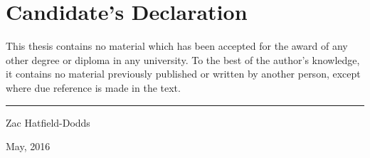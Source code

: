 \chapter{Candidate's Declaration}

This thesis contains no material which has been accepted for the award
of any other degree or diploma in any university. To the best of the
author's knowledge, it contains no material previously published or written
by another person, except where due reference is made in the text.


\vspace{20mm}  %

\hspace{80mm}\rule{40mm}{.15mm}\par   %
\hspace{80mm} Zac Hatfield-Dodds\par
\hspace{80mm} May, 2016


\clearpage
\thispagestyle{empty}
